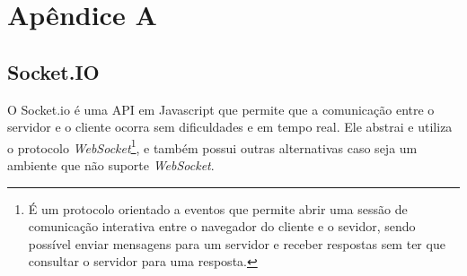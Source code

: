 \chapter{Apêndice A}
\label{apendiceA}


\section{Socket.IO}
\label{sec: Socket.io}
O Socket.io é uma API em Javascript que permite que a comunicação entre o servidor e o cliente ocorra sem dificuldades e em tempo real. Ele abstrai e utiliza o protocolo \textit{WebSocket}\footnote{É um protocolo orientado a eventos que permite abrir uma sessão de comunicação interativa entre o navegador do cliente e o sevidor, sendo possível enviar mensagens para um servidor e receber respostas sem ter que consultar o servidor para uma resposta.},  e também possui outras alternativas caso seja um ambiente que não suporte \textit{WebSocket}.




 